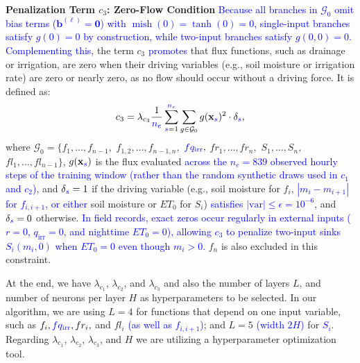 \documentclass[pdflatex,sn-nature]{sn-jnl}%
\theoremstyle{thmstyleone}%
\theoremstyle{thmstyletwo}%
\theoremstyle{thmstylethree}%
\begin{document}
\textbf{Penalization Term \( c_3 \): Zero-Flow Condition}
\textcolor{blue}{Because all branches in $\mathcal{G}_0$ omit bias terms ($\mathbf{b}^{(\ell)} = \mathbf{0}$) with $\operatorname{mish}(0) = \tanh(0) = 0$, single-input branches satisfy $g(0) = 0$ by construction, while two-input branches satisfy $g(0,0) = 0$. Complementing this,} the term \( c_3 \) \textcolor{blue}{promotes} that flux functions, such as drainage or irrigation, are zero when their driving variables (e.g., soil moisture or irrigation rate) are zero or nearly zero, as no flow should occur without a driving force. It is defined as:
\[
c_3 = \lambda_{c_3} \frac{1}{\textcolor{blue}{n_e}} \sum_{\textcolor{blue}{s}=1}^{\textcolor{blue}{n_e}} \sum_{g \in \mathcal{G}_0} g(\mathbf{x}_{\textcolor{blue}{s}})^2 \cdot \delta_{\textcolor{blue}{s}},
\]
where $\mathcal{G}_0 = \{ f_1, \dots, f_{n-1},$ $f_{1,2}, \dots, f_{n-1,n},$ $\textcolor{blue}{fq_{\mathrm{irr}}},$ $fr_1, \dots, fr_n,$ $S_1, \dots, S_n,$ $fl_1, \dots, fl_{n-1} \}$, \( g(\mathbf{x}_{\textcolor{blue}{s}}) \) is the flux evaluated \textcolor{blue}{across the $n_e = 839$ observed hourly steps of the training window (rather than the random synthetic draws used in $c_1$ and $c_2$)}, and \( \delta_{\textcolor{blue}{s}} = 1 \) if the driving variable (e.g., soil moisture for \( f_i \), \textcolor{blue}{$|m_i - m_{i+1}|$ for $f_{i,i+1}$, or either} soil moisture or \( ET_0 \) for \( S_i \)) \textcolor{blue}{satisfies $|\text{var}| \le \epsilon = 10^{-6}$}, and \( \delta_{\textcolor{blue}{s}} = 0 \) otherwise. \textcolor{blue}{In field records, exact zeros occur regularly in external inputs ($r = 0$, $q_{\mathrm{irr}} = 0$, and nighttime $ET_0 = 0$), allowing $c_3$ to penalize two-input sinks $S_i(m_i, 0)$ when $ET_0 = 0$ even though $m_i > 0$.} \( f_n \) is also excluded in this constraint.

At the end, we have $\lambda_{c_1}$, $\lambda_{c_2}$, and $\lambda_{c_3}$ and also the number of layers $L$, and number of neurons per layer $H$ as hyperparameters to be selected. In our algorithm, we are using $L=4$ for functions that depend on one input variable, such as $f_i, \textcolor{blue}{fq_{\mathrm{irr}}}, fr_i,$ and $fl_i$ \textcolor{blue}{(as well as $f_{i,i+1}$)}; and $L=5$ \textcolor{blue}{(width $2H$)} for \textcolor{blue}{$S_i$}. Regarding $\lambda_{c_1}$, $\lambda_{c_2}$, $\lambda_{c_3}$, and $H$ we are utilizing a hyperparameter optimization tool.
\end{document}
